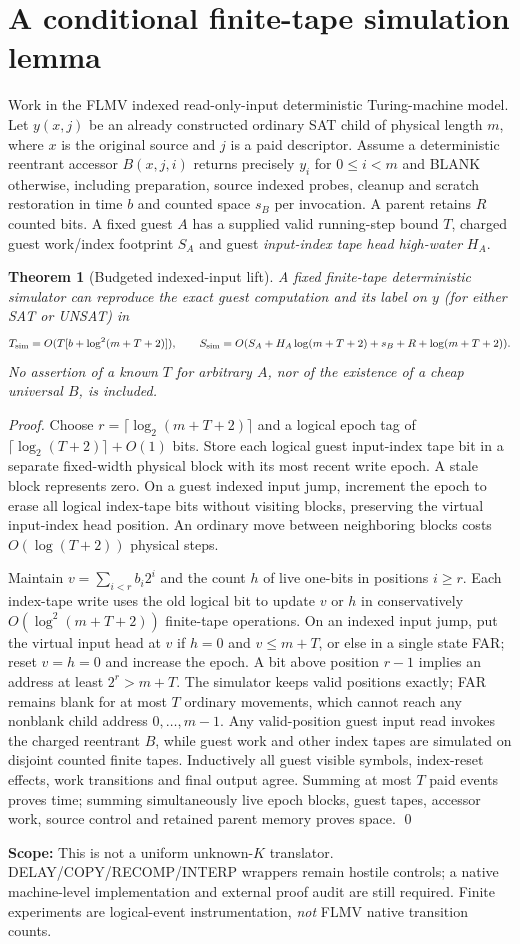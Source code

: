 \documentclass[11pt]{article}
\newtheorem{theorem}{Theorem}
\begin{document}
\section{A conditional finite-tape simulation lemma}
Work in the FLMV indexed read-only-input deterministic Turing-machine model. Let $y(x,j)$ be an already constructed ordinary SAT child of physical length $m$, where $x$ is the original source and $j$ is a paid descriptor. Assume a deterministic reentrant accessor $B(x,j,i)$ returns precisely $y_i$ for $0\le i<m$ and BLANK otherwise, including preparation, source indexed probes, cleanup and scratch restoration in time $b$ and counted space $s_B$ per invocation. A parent retains $R$ counted bits. A fixed guest $A$ has a supplied valid running-step bound $T$, charged guest work/index footprint $S_A$ and guest \emph{input-index tape head high-water} $H_A$.
\begin{theorem}[Budgeted indexed-input lift]
A fixed finite-tape deterministic simulator can reproduce the exact guest computation and its label on $y$ (for either SAT or UNSAT) in
\[
T_{\rm sim}=O(T[b+\log^2(m+T+2)]),\qquad
S_{\rm sim}=O(S_A+H_A\log(m+T+2)+s_B+R+\log(m+T+2)).
\]
No assertion of a known $T$ for arbitrary $A$, nor of the existence of a cheap universal $B$, is included.
\end{theorem}
\begin{proof}
Choose $r=\lceil\log_2(m+T+2)\rceil$ and a logical epoch tag of $\lceil\log_2(T+2)\rceil+O(1)$ bits. Store each logical guest input-index tape bit in a separate fixed-width physical block with its most recent write epoch. A stale block represents zero. On a guest indexed input jump, increment the epoch to erase all logical index-tape bits without visiting blocks, preserving the virtual input-index head position. An ordinary move between neighboring blocks costs $O(\log(T+2))$ physical steps.

Maintain $v=\sum_{i<r}b_i 2^i$ and the count $h$ of live one-bits in positions $i\ge r$. Each index-tape write uses the old logical bit to update $v$ or $h$ in conservatively $O(\log^2(m+T+2))$ finite-tape operations. On an indexed input jump, put the virtual input head at $v$ if $h=0$ and $v\le m+T$, or else in a single state FAR; reset $v=h=0$ and increase the epoch. A bit above position $r-1$ implies an address at least $2^r>m+T$. The simulator keeps valid positions exactly; FAR remains blank for at most $T$ ordinary movements, which cannot reach any nonblank child address $0,\ldots,m-1$. Any valid-position guest input read invokes the charged reentrant $B$, while guest work and other index tapes are simulated on disjoint counted finite tapes. Inductively all guest visible symbols, index-reset effects, work transitions and final output agree. Summing at most $T$ paid events proves time; summing simultaneously live epoch blocks, guest tapes, accessor work, source control and retained parent memory proves space. \qed
\end{proof}
\noindent\textbf{Scope:} This is not a uniform unknown-$K$ translator. DELAY/COPY/RECOMP/INTERP wrappers remain hostile controls; a native machine-level implementation and external proof audit are still required. Finite experiments are logical-event instrumentation, \emph{not} FLMV native transition counts.
\end{document}
